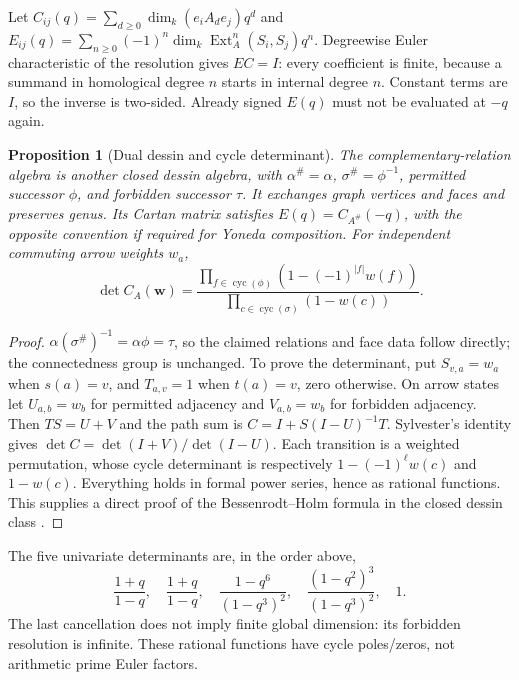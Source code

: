 \documentclass[11pt,oneside,openany]{book}
\newtheorem{proposition}[theorem]{Proposition}
\theoremstyle{definition}\newtheorem{definition}[theorem]{Definition}
\theoremstyle{remark}\newtheorem{remark}[theorem]{Remark}
\begin{document}
Let $C_{ij}(q)=\sum_{d\ge0}\dim_k(e_iA_de_j)q^d$ and $E_{ij}(q)=\sum_{n\ge0}(-1)^n\dim_k\operatorname{Ext}_A^n(S_i,S_j)q^n$. Degreewise Euler characteristic of the resolution gives $EC=I$: every coefficient is finite, because a summand in homological degree $n$ starts in internal degree $n$. Constant terms are $I$, so the inverse is two-sided. Already signed $E(q)$ must not be evaluated at $-q$ again.

\begin{proposition}[Dual dessin and cycle determinant]\label{thm:cartan}
The complementary-relation algebra is another closed dessin algebra, with $\alpha^\#=\alpha$, $\sigma^\#=\phi^{-1}$, permitted successor $\phi$, and forbidden successor $\tau$. It exchanges graph vertices and faces and preserves genus. Its Cartan matrix satisfies $E(q)=C_{A^\#}(-q)$, with the opposite convention if required for Yoneda composition. For independent commuting arrow weights $w_a$,
\[
 \det C_A(\mathbf w)=
 \frac{\prod_{f\in\operatorname{cyc}(\phi)}(1-(-1)^{|f|}w(f))}
 {\prod_{c\in\operatorname{cyc}(\sigma)}(1-w(c))}.
\]
\end{proposition}
\begin{proof}
$\alpha(\sigma^\#)^{-1}=\alpha\phi=\tau$, so the claimed relations and face data follow directly; the connectedness group is unchanged. To prove the determinant, put $S_{v,a}=w_a$ when $s(a)=v$, and $T_{a,v}=1$ when $t(a)=v$, zero otherwise. On arrow states let $U_{a,b}=w_b$ for permitted adjacency and $V_{a,b}=w_b$ for forbidden adjacency. Then $TS=U+V$ and the path sum is $C=I+S(I-U)^{-1}T$. Sylvester's identity gives $\det C=\det(I+V)/\det(I-U)$. Each transition is a weighted permutation, whose cycle determinant is respectively $1-(-1)^\ell w(c)$ and $1-w(c)$. Everything holds in formal power series, hence as rational functions. This supplies a direct proof of the Bessenrodt--Holm formula in the closed dessin class \cite{BessenrodtHolm}.
\end{proof}
The five univariate determinants are, in the order above,
\[
 \frac{1+q}{1-q},\quad\frac{1+q}{1-q},\quad
 \frac{1-q^6}{(1-q^3)^2},\quad
 \frac{(1-q^2)^3}{(1-q^3)^2},\quad 1.
\]
The last cancellation does not imply finite global dimension: its forbidden resolution is infinite. These rational functions have cycle poles/zeros, not arithmetic prime Euler factors.
\end{document}
